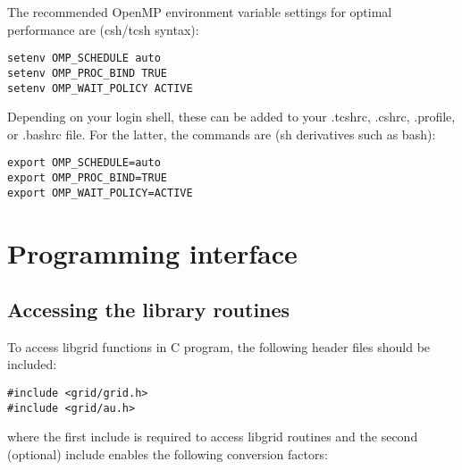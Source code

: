 \documentclass[12pt,letterpaper]{report}
\begin{document}
\noindent
The recommended OpenMP environment variable settings for optimal performance are (csh/tcsh syntax):
\begin{verbatim}
setenv OMP_SCHEDULE auto
setenv OMP_PROC_BIND TRUE
setenv OMP_WAIT_POLICY ACTIVE
\end{verbatim}
Depending on your login shell, these can be added to your .tcshrc, .cshrc, .profile, or .bashrc file. For the latter, the commands are (sh derivatives such as bash):
\begin{verbatim}
export OMP_SCHEDULE=auto
export OMP_PROC_BIND=TRUE
export OMP_WAIT_POLICY=ACTIVE
\end{verbatim}

\chapter{Programming interface}

\section{Accessing the library routines}

To access libgrid functions in C program, the following header files should be included:
\begin{verbatim}
#include <grid/grid.h>
#include <grid/au.h>
\end{verbatim}
where the first include is required to access libgrid routines and the second (optional) include enables the following conversion factors:\\
\end{document}
